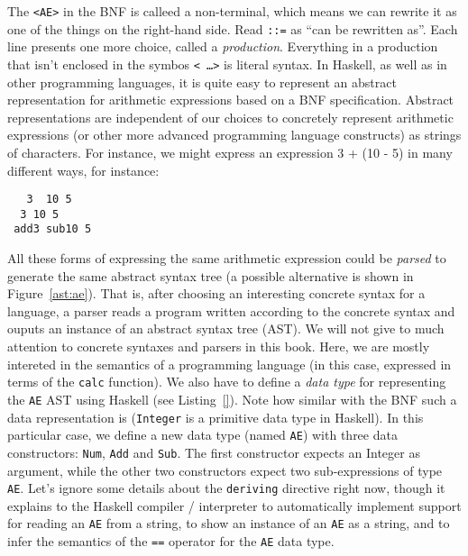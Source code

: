 \documentclass{book}
\renewcommand{\emph}[1]{{\color{blue}\textit{#1}}}
\begin{document}
The \texttt{<AE>} in the \textsc{BNF} is calleed a non-terminal, 
which means we can rewrite it as one of the things on 
the right-hand side. Read \texttt{::=} as ``can be rewritten as''. 
Each line presents one more choice, called a 
\emph{production}. Everything in a production that isn't enclosed 
in the symbos \texttt{< \ldots >} is literal syntax. In Haskell, 
as well as in other programming languages, it is quite easy to 
represent an abstract representation for arithmetic expressions 
based on a \textsc{BNF} specification. Abstract representations 
are independent of our choices to concretely represent arithmetic 
expressions (or other more advanced programming 
language constructs) as strings of characters. For instance, we might 
express an expression 3 + (10 - 5) in many different ways, for instance: 

\begin{tabbing}\tt
~~3~~10~5\\
\tt ~~3~10~5\\
\tt ~add3~sub10~5
\end{tabbing}

All these forms of expressing the same arithmetic expression 
could be \emph{parsed} to generate the same abstract 
syntax tree (a possible alternative is shown in Figure~\ref{ast:ae}). That is, 
after choosing an interesting concrete syntax for a language, 
a parser reads a program written according to the concrete 
syntax and ouputs an instance of an abstract syntax tree (AST). We will 
not give to much attention to concrete syntaxes and parsers in this 
book. Here, we are mostly intereted in the semantics of a programming 
language (in this case, expressed in terms of the \texttt{calc} 
function). We also have to define a \emph{data type} for representing the 
\texttt{AE} AST using Haskell (see Listing~\ref{}). Note 
how similar with the \textsc{BNF} such a data representation 
is (\texttt{Integer} is a primitive data type in Haskell). In this particular 
case, we define a new data type (named \texttt{AE}) with three data constructors: 
\texttt{Num}, \texttt{Add} and \texttt{Sub}. The first constructor expects an 
Integer as argument, while the other two constructors expect two sub-expressions 
of type \texttt{AE}. Let's ignore some details about the \texttt{deriving} directive 
right now, though it explains to the Haskell compiler / interpreter to automatically 
implement support for reading an \texttt{AE} from a string, to show an instance of 
an \texttt{AE} as a string, and to infer the semantics of the \texttt{==} operator 
for the \texttt{AE} data type.
\end{document}
